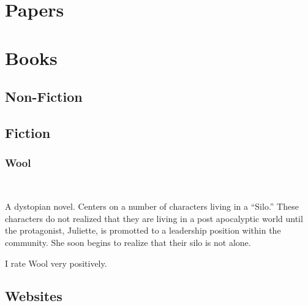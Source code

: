 \documentclass[12pt]{article}
\newenvironment{annotatedcitation}[2]%
{\bigskip \subsubsection*{#1}  \fullcite{#2} \\ \smallskip \noindent}%
{\bigskip}
\begin{document}
\section{Papers}

\section{Books}

\subsection{Non-Fiction}

\subsection{Fiction}

  \begin{annotatedcitation}{Wool}{howey12}

    A dystopian novel. Centers on a number of characters living in a
    ``Silo.'' These characters do not realized that they are living in a
    post apocalyptic world until the protagonist, Juliette, is promotted
    to a leadership position within the community. She soon begins to
    realize that their silo is not alone.

    I rate Wool very positively.
  \end{annotatedcitation}

\subsection{Websites}
\end{document}
